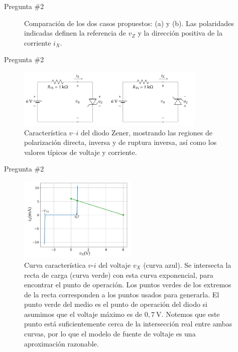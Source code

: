 \documentclass[
    10pt,
    aspectratio=169,
    xcolor={dvipsnames},
    spanish,
    ]{beamer}
\begin{document}
\begin{frame}{Pregunta \#2}
\begin{figure}[H]
  \caption{Comparación de los dos casos propuestos: (a) y (b). Las polaridades indicadas definen la referencia de $v_Z$ y la dirección positiva de la corriente $i_X$.}
  \label{fig:ex4ab}
\end{figure}
\end{frame}

\begin{frame}{Pregunta \#2}
  \begin{figure}[H]
    \centering
    \includegraphics[width=0.8\textwidth]{Auxiliar_4_7}
      \caption{Característica $v$--$i$ del diodo Zener, mostrando las regiones de polarización directa, inversa y de ruptura inversa, así como los valores típicos de voltaje y corriente.}
    \label{fig:ex4c}
  \end{figure}
\end{frame}
\begin{frame}{Pregunta \#2}
  \begin{figure}[H]
  \centering
  \includegraphics[width=0.5\textwidth]{Auxiliar_4_8}
  \caption{Curva característica \(v\)-\(i\) del voltaje \(v_X\) (curva azul). 
  Se intersecta la recta de carga (curva verde) con esta curva exponencial, para encontrar el punto de operación. 
  Los puntos verdes de los extremos de la recta corresponden a los puntos usados para generarla. 
  El punto verde del medio es el punto de operación del diodo si asumimos que el voltaje máximo es de \(0{,}7~\text{V}\). 
  Notemos que este punto está suficientemente cerca de la intersección real entre ambas curvas, por lo que el modelo de fuente de voltaje es una aproximación razonable.}
  \label{fig:carac-v-i}
\end{figure}
\end{frame}
\end{document}
